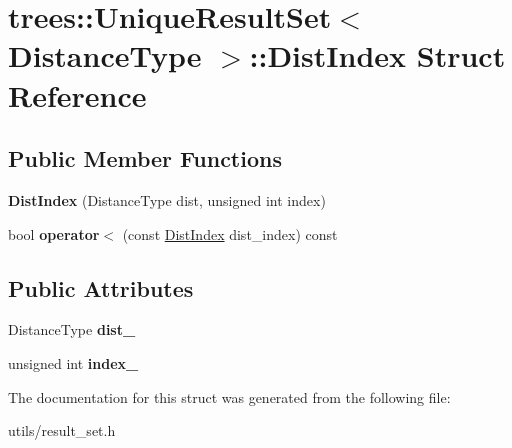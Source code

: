 \hypertarget{structtrees_1_1_unique_result_set_1_1_dist_index}{}\section{trees\+:\+:Unique\+Result\+Set$<$ Distance\+Type $>$\+:\+:Dist\+Index Struct Reference}
\label{structtrees_1_1_unique_result_set_1_1_dist_index}
\subsection*{Public Member Functions}
\begin{DoxyCompactItemize}
\item 
\mbox{\label{structtrees_1_1_unique_result_set_1_1_dist_index_aac8345219321567db4a9ccd0da7ed827}} 
{\bfseries Dist\+Index} (Distance\+Type dist, unsigned int index)
\item 
\mbox{\label{structtrees_1_1_unique_result_set_1_1_dist_index_abf0c04fdea75664003b96a0f8735c017}} 
bool {\bfseries operator$<$} (const \hyperlink{structtrees_1_1_unique_result_set_1_1_dist_index}{Dist\+Index} dist\+\_\+index) const
\end{DoxyCompactItemize}
\subsection*{Public Attributes}
\begin{DoxyCompactItemize}
\item 
\mbox{\label{structtrees_1_1_unique_result_set_1_1_dist_index_aa382acdc4be772e9788f1d77a1cfa247}} 
Distance\+Type {\bfseries dist\+\_\+}
\item 
\mbox{\label{structtrees_1_1_unique_result_set_1_1_dist_index_a2ad613379c6478910c675a86e9aac5cd}} 
unsigned int {\bfseries index\+\_\+}
\end{DoxyCompactItemize}


The documentation for this struct was generated from the following file\+:\begin{DoxyCompactItemize}
\item 
utils/result\+\_\+set.\+h\end{DoxyCompactItemize}
